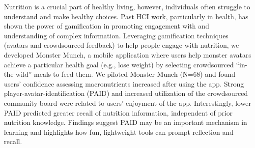 

Nutrition is a crucial part of healthy living, however, individuals often struggle to understand and make healthy choices. Past HCI work, particularly in health, has shown the power of gamification in promoting engagement with and understanding of complex information. Leveraging gamification techniques (avatars and crowdsourced feedback) to help people engage with nutrition, we developed Monster Munch, a mobile application where users help monster avatars achieve a particular health goal (e.g., lose weight) by selecting crowdsourced “in-the-wild” meals to feed them. We piloted Monster Munch (N=68) and found users' confidence assessing macronutrients increased after using the app. Strong player-avatar-identification (PAID) and increased utilization of the crowdsourced community board were related to users' enjoyment of the app. Interestingly, lower PAID predicted greater recall of nutrition information, independent of prior nutrition knowledge. Findings suggest PAID may be an important mechanism in learning and highlights how fun, lightweight tools can prompt reflection and recall.










  
